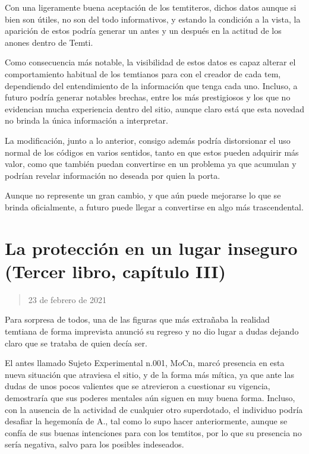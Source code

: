 \documentclass[
]{book}
\begin{document}
Con una ligeramente buena aceptación de los temtiteros, dichos datos aunque si bien son útiles, no son del todo informativos, y estando la condición a la vista, la aparición de estos podría generar un antes y un después en la actitud de los anones dentro de Temti.

Como consecuencia más notable, la visibilidad de estos datos es capaz alterar el comportamiento habitual de los temtianos para con el creador de cada tem, dependiendo del entendimiento de la información que tenga cada uno. Incluso, a futuro podría generar notables brechas, entre los más prestigiosos y los que no evidencian mucha experiencia dentro del sitio, aunque claro está que esta novedad no brinda la única información a interpretar.

La modificación, junto a lo anterior, consigo además podría distorsionar el uso normal de los códigos en varios sentidos, tanto en que estos pueden adquirir más valor, como que también puedan convertirse en un problema ya que acumulan y podrían revelar información no deseada por quien la porta.

Aunque no represente un gran cambio, y que aún puede mejorarse lo que se brinda oficialmente, a futuro puede llegar a convertirse en algo más trascendental.

\hypertarget{la-protecciuxf3n-en-un-lugar-inseguro-tercer-libro-capuxedtulo-iii}{%
\section{La protección en un lugar inseguro (Tercer libro, capítulo III)}\label{la-protecciuxf3n-en-un-lugar-inseguro-tercer-libro-capuxedtulo-iii}}

\begin{quote}
23 de febrero de 2021
\end{quote}

Para sorpresa de todos, una de las figuras que más extrañaba la realidad temtiana de forma imprevista anunció su regreso y no dio lugar a dudas dejando claro que se trataba de quien decía ser.

El antes llamado Sujeto Experimental n.001, MoCn, marcó presencia en esta nueva situación que atraviesa el sitio, y de la forma más mítica, ya que ante las dudas de unos pocos valientes que se atrevieron a cuestionar su vigencia, demostraría que sus poderes mentales aún siguen en muy buena forma. Incluso, con la ausencia de la actividad de cualquier otro superdotado, el individuo podría desafiar la hegemonía de A., tal como lo supo hacer anteriormente, aunque se confía de sus buenas intenciones para con los temtitos, por lo que su presencia no sería negativa, salvo para los posibles indeseados.
\end{document}
